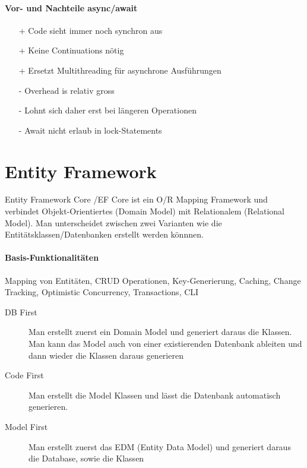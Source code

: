 \documentclass[
a4paper,
oneside,
10pt,
fleqn,
headsepline,
toc=listofnumbered, 
bibliography=totocnumbered]{scrartcl}
\let\stdsection\section
\renewcommand\section{\clearpage\stdsection}
\begin{document}
\paragraph{Vor- und Nachteile async/await}
\begin{itemize}
	\item[+] Code sieht immer noch synchron aus
	\item[+] Keine Continuations nötig
	\item[+] Ersetzt Multithreading für asynchrone Ausführungen
	\item[-] Overhead is relativ gross
	\item[-] Lohnt sich daher erst bei längeren Operationen
	\item[-] Await nicht erlaub in lock-Statements
\end{itemize}

\section{Entity Framework}
Entity Framework Core /EF Core ist ein O/R Mapping Framework und verbindet Objekt-Orientiertes (Domain Model) mit Relationalem (Relational Model). Man unterscheidet zwischen zwei Varianten wie die Entitätsklassen/Datenbanken erstellt werden könnnen.
\paragraph{Basis-Funktionalitäten} Mapping von Entitäten, CRUD Operationen, Key-Generierung, Caching, Change Tracking, Optimistic Concurrency, Transactions, CLI
\begin{description}
	\item[DB First] Man erstellt zuerst ein Domain Model und generiert daraus die Klassen. Man kann das Model auch von einer existierenden Datenbank ableiten und dann wieder die Klassen daraus generieren
	\item[Code First] Man erstellt die Model Klassen und lässt die Datenbank automatisch generieren.
	\item[Model First] Man erstellt zuerst das EDM (Entity Data Model) und generiert daraus die Database, sowie die Klassen
\end{description}
\end{document}
